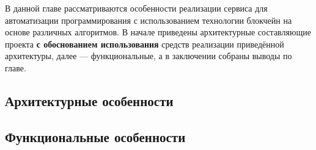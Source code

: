 В данной главе рассматриваются особенности реализации сервиса для
автоматизации программирования с использованием технологии блокчейн на основе
различных алгоритмов. В начале приведены архитектурные составляющие проекта
\textbf{с обоснованием использования} средств реализации приведённой
архитектуры, далее --- функциональные, а в заключении собраны выводы по главе.

\subsection{Архитектурные особенности}

\subsection{Функциональные особенности}

